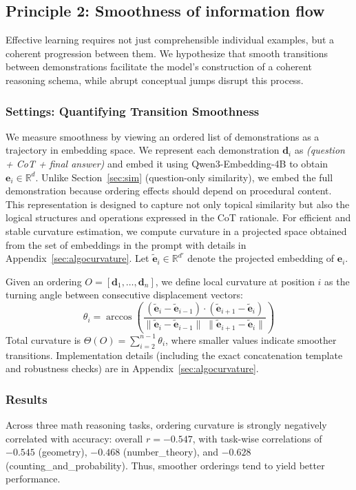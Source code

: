 \subsection{Principle 2: Smoothness of information flow}
\label{sec:curvature_corr}


Effective learning requires not just comprehensible individual examples, but a coherent progression between them. We hypothesize that smooth transitions between demonstrations facilitate the model's construction of a coherent reasoning schema, while abrupt conceptual jumps disrupt this process.
\subsubsection{Settings: Quantifying Transition Smoothness}

We measure smoothness by viewing an ordered list of demonstrations as a trajectory in embedding space.
We represent each demonstration $\mathbf{d}_i$ as \emph{(question + CoT + final answer)} and embed it using Qwen3-Embedding-4B to obtain $\mathbf{e}_i \in \mathbb{R}^d$.
Unlike Section~\ref{sec:sim} (question-only similarity), we embed the full demonstration because ordering effects should depend on procedural content.
This representation is designed to capture not only topical similarity but also the logical structures and operations expressed in the CoT rationale.
For efficient and stable curvature estimation, we compute curvature in a projected space obtained from the set of embeddings in the prompt with details in Appendix~\ref{sec:algocurvature}.
Let $\tilde{\mathbf{e}}_i \in \mathbb{R}^{d'}$ denote the projected embedding of $\mathbf{e}_i$.


Given an ordering $O=[\mathbf{d}_1,\dots,\mathbf{d}_n]$, we define local curvature at position $i$ as the turning angle between consecutive displacement vectors:
\begin{equation}
\theta_i
=
\arccos\left(
\frac{(\tilde{\mathbf{e}}_{i} - \tilde{\mathbf{e}}_{i-1}) \cdot (\tilde{\mathbf{e}}_{i+1} - \tilde{\mathbf{e}}_{i})}
{\|\tilde{\mathbf{e}}_{i} - \tilde{\mathbf{e}}_{i-1}\|\;\|\tilde{\mathbf{e}}_{i+1} - \tilde{\mathbf{e}}_{i}\|}
\right)
\end{equation}
Total curvature is $\Theta(O)=\sum_{i=2}^{n-1}\theta_i$, where smaller values indicate smoother transitions.
Implementation details (including the exact concatenation template and robustness checks) are in Appendix~\ref{sec:algocurvature}.

\subsubsection{Results}
Across three math reasoning tasks, ordering curvature is strongly negatively correlated with accuracy: overall $r=-0.547$, with task-wise correlations of $-0.545$ (geometry), $-0.468$ (number\_theory), and $-0.628$ (counting\_and\_probability).
Thus, smoother orderings tend to yield better performance.

